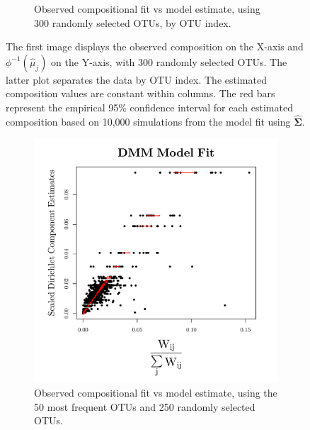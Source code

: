 \documentclass{template}
\begin{document}
\begin{figure}[ht!]
\begin{subfigure}[b]{0.38\textheight}
        \caption{Observed compositional fit vs model estimate, using 300 randomly selected OTUs, by OTU index.}
    \end{subfigure}
    \caption{The first image displays the observed composition on the X-axis and $\phi^{-1}(\hat{\mu}_j)$ on the Y-axis, with 300 randomly selected OTUs. The latter plot separates the data by OTU index. The estimated composition values are constant within columns. The red bars represent the empirical 95\% confidence interval for each estimated composition based on 10,000 simulations from the model fit using $\hat{\boldsymbol{\Sigma}}$.}\label{fig:compFitBar300}
\end{figure}


\clearpage 

\begin{figure}[ht!]
    \centering
    \begin{subfigure}[b]{0.36\textheight}
        \includegraphics[width=\textwidth]{Images/DMM250.pdf}
        \caption{Observed compositional fit vs model estimate, using the 50 most frequent OTUs and 250 randomly selected OTUs.}
    \end{subfigure}
\\
    \begin{subfigure}[b]{0.36\textheight}

\end{subfigure}
\end{figure}
\end{document}
